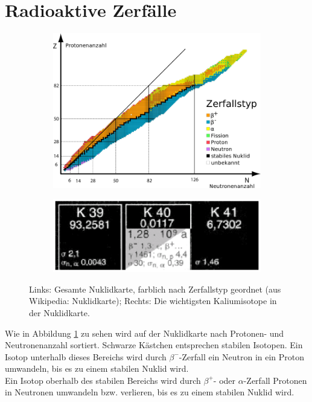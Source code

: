 \documentclass{article}
\begin{document}
\section{Radioaktive Zerfälle}
\begin{center}
\begin{figure}[H]
\begin{subfigure}{0.52\textwidth}
\includegraphics[width=0.9\linewidth]{nuklidkarte.png}
\end{subfigure}
\begin{subfigure}{0.52\textwidth}
\includegraphics[width=0.9\linewidth]{K-nuklidkarte.eps}
\end{subfigure}
\caption{Links: Gesamte Nuklidkarte, farblich nach Zerfallstyp geordnet (aus Wikipedia: Nuklidkarte); Rechts: Die wichtigsten Kaliumisotope in der Nuklidkarte.}
\label{fig:nuklidkarte}
\end{figure}
\end{center}
Wie in Abbildung \ref{fig:nuklidkarte} zu sehen wird auf der Nuklidkarte nach Protonen- und Neutronenanzahl sortiert. Schwarze Kästchen entsprechen stabilen Isotopen. Ein Isotop unterhalb dieses Bereichs wird durch $\beta^-$-Zerfall ein Neutron in ein Proton umwandeln, bis es zu einem stabilen Nuklid wird.\\
Ein Isotop oberhalb des stabilen Bereichs wird durch $\beta^+$- oder $\alpha$-Zerfall Protonen in Neutronen umwandeln bzw. verlieren, bis es zu einem stabilen Nuklid wird.\\
\end{document}
